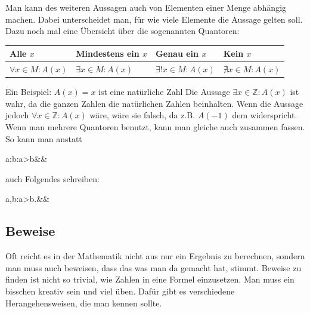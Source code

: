 \documentclass[12pt]{article}
\begin{document}
		Man kann des weiteren Aussagen auch von Elementen einer Menge abhängig machen. Dabei unterscheidet man, für wie viele Elemente die Aussage gelten soll. Dazu noch mal eine Übersicht über die sogenannten Quantoren:
		\begin{center}
			\bgroup
			\def\arraystretch{1.5}
			\begin{tabularx}{\linewidth}{|X|X|X|X|}
				\hline
				Alle $x$ & Mindestens ein $x$ & Genau ein $x$ & Kein $x$ \\ \hline
				$\forall x\in M:A(x)$ & $\exists x\in M:A(x)$ & $\exists! x\in M:A(x)$ & $\nexists x\in M:A(x)$ \\ \hline
			\end{tabularx}
			\egroup
		\end{center}
		Ein Beispiel: $A(x) = x$ ist eine natürliche Zahl\newline
		Die Aussage $\exists x\in \mathbb{Z}:A(x)$ ist wahr, da die ganzen Zahlen die natürlichen Zahlen beinhalten. Wenn die Aussage jedoch $\forall x\in \mathbb{Z}:A(x)$ wäre, wäre sie falsch, da z.B. $A(-1)$ dem widerspricht. Wenn man mehrere Quantoren benutzt, kann man gleiche auch zusammen fassen. So kann man anstatt
		\begin{flalign*}
			\forall a\in {}:\forall b\in {}:a>b&&
		\end{flalign*}
		auch Folgendes schreiben:
		\begin{flalign*}
			\forall a,b\in \mathbb{N}:a>b.&&
		\end{flalign*}
		\subsection{Beweise}
		\label{subsec:beweise}
			Oft reicht es in der Mathematik nicht aus nur ein Ergebnis zu berechnen, sondern man muss auch beweisen, dass das was man da gemacht hat, stimmt. Beweise zu finden ist nicht so trivial, wie Zahlen in eine Formel einzusetzen. Man muss ein bisschen kreativ sein und viel üben. Dafür gibt es verschiedene Herangehensweisen, die man kennen sollte.
\end{document}
